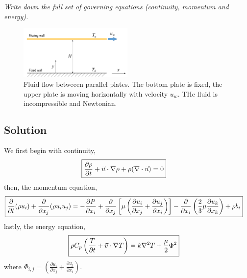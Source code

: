 

\section{}
\textit{Write down the full set of governing equations (continuity, momentum and energy).}

\begin{figure}[h]
    \centering
    \includegraphics[width=0.5\textwidth]{Questions/Figures/Q1 diagram.png}
    \caption{Fluid flow betweeen parallel plates. The bottom plate is fixed, the upper plate is moving horizontally with velocity $u_w$. THe fluid is incompressible and Newtonian.}
    \label{fig:Q1 diagram}
\end{figure}

\subsection*{Solution}
We first begin with continuity, 
\begin{align*}
    \Aboxed{\frac{\partial \rho}{\partial t} + \vec{u} \cdot \nabla \rho + \rho (\nabla \cdot \vec{u}) &= 0}
\end{align*}
then, the momentum equation,
\begin{align*}
    \Aboxed{\frac{\partial}{\partial t} (\rho u_i) + \frac{\partial}{\partial x_j} (\rho u_i u_j) &= -\frac{\partial P}{\partial x_i} + \frac{\partial}{\partial x_j} \left[ \mu \left( \frac{\partial u_i}{\partial x_j} + \frac{\partial u_j}{\partial x_i} \right) \right] - \frac{\partial}{\partial x_i} \left(\frac{2}{3} \mu \frac{\partial u_k}{\partial x_k} \right) + \rho b_i}
\end{align*}
lastly, the energy equation,
\begin{align*}
    \Aboxed{\rho C_p \left(\frac{T}{\partial t} + \vec{v} \cdot \nabla T \right) &= k \nabla^2 T + \frac{\mu}{2} \Phi^2}
\end{align*}
where $\Phi_{i, j} = \left( \frac{\partial u_i}{\partial x_j} + \frac{\partial u_j}{\partial x_i} \right)$.


